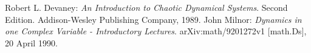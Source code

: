 \documentclass{mywork}
\begin{document}
\begin{thebibliography}{tief}
 Robert L. Devaney: {\it An Introduction to Chaotic Dynamical Systems}. Second Edition.
                     Addison-Wesley Publishing Company, 1989.
 John Milnor: {\it Dynamics in one Complex Variable - Introductory Lectures}.  arXiv:math/9201272v1 [math.Ds], 20 April 1990.
\end{thebibliography} 
\end{document}
